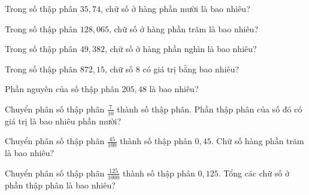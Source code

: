 
\begin{ex}
  Trong số thập phân $35{,}74$, chữ số ở hàng phần mười là bao nhiêu?
\end{ex}

\begin{ex}
  Trong số thập phân $128{,}065$, chữ số ở hàng phần trăm là bao nhiêu?
\end{ex}

\begin{ex}
  Trong số thập phân $49{,}382$, chữ số ở hàng phần nghìn là bao nhiêu?
\end{ex}

\begin{ex}
  Trong số thập phân $872{,}15$, chữ số $8$ có giá trị bằng bao nhiêu?
\end{ex}

\begin{ex}
  Phần nguyên của số thập phân $205{,}48$ là bao nhiêu?
\end{ex}

\begin{ex}
  Chuyển phân số thập phân $\frac{7}{10}$ thành số thập phân. Phần thập phân của số đó có giá trị là bao nhiêu phần mười?
\end{ex}

\begin{ex}
  Chuyển phân số thập phân $\frac{45}{100}$ thành số thập phân $0{,}45$. Chữ số hàng phần trăm là bao nhiêu?
\end{ex}

\begin{ex}
  Chuyển phân số thập phân $\frac{125}{1000}$ thành số thập phân $0{,}125$. Tổng các chữ số ở phần thập phân là bao nhiêu?
\end{ex}


